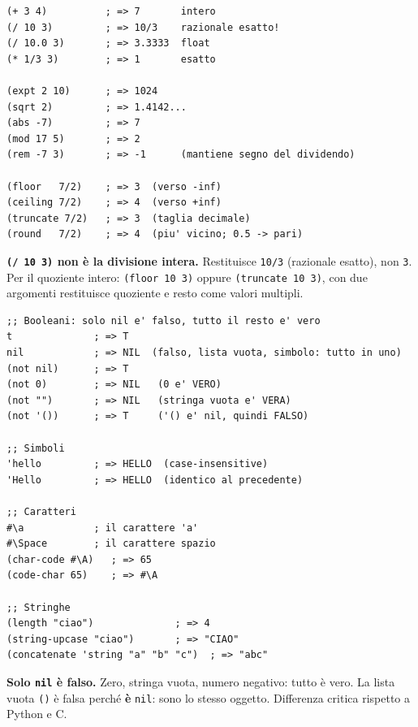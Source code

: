 \begin{esempio}
\begin{lstlisting}
(+ 3 4)          ; => 7       intero
(/ 10 3)         ; => 10/3    razionale esatto!
(/ 10.0 3)       ; => 3.3333  float
(* 1/3 3)        ; => 1       esatto

(expt 2 10)      ; => 1024
(sqrt 2)         ; => 1.4142...
(abs -7)         ; => 7
(mod 17 5)       ; => 2
(rem -7 3)       ; => -1      (mantiene segno del dividendo)

(floor   7/2)    ; => 3  (verso -inf)
(ceiling 7/2)    ; => 4  (verso +inf)
(truncate 7/2)   ; => 3  (taglia decimale)
(round   7/2)    ; => 4  (piu' vicino; 0.5 -> pari)
\end{lstlisting}
\end{esempio}

\begin{attenzione}
\textbf{\texttt{(/ 10 3)} non è la divisione intera.}
Restituisce \texttt{10/3} (razionale esatto), non \texttt{3}.
Per il quoziente intero: \texttt{(floor 10 3)} oppure
\texttt{(truncate 10 3)}, con due argomenti restituisce
quoziente e resto come valori multipli.
\end{attenzione}

\seprule


\begin{esempio}
\begin{lstlisting}
;; Booleani: solo nil e' falso, tutto il resto e' vero
t              ; => T
nil            ; => NIL  (falso, lista vuota, simbolo: tutto in uno)
(not nil)      ; => T
(not 0)        ; => NIL   (0 e' VERO)
(not "")       ; => NIL   (stringa vuota e' VERA)
(not '())      ; => T     ('() e' nil, quindi FALSO)

;; Simboli
'hello         ; => HELLO  (case-insensitive)
'Hello         ; => HELLO  (identico al precedente)

;; Caratteri
#\a            ; il carattere 'a'
#\Space        ; il carattere spazio
(char-code #\A)   ; => 65
(code-char 65)    ; => #\A

;; Stringhe
(length "ciao")              ; => 4
(string-upcase "ciao")       ; => "CIAO"
(concatenate 'string "a" "b" "c")  ; => "abc"
\end{lstlisting}
\end{esempio}

\begin{attenzione}
\textbf{Solo \texttt{nil} è falso.} Zero, stringa vuota, numero
negativo: tutto è vero. La lista vuota \texttt{()} è falsa
perché \textbf{è} \texttt{nil}: sono lo stesso oggetto.
Differenza critica rispetto a Python e C.
\end{attenzione}

